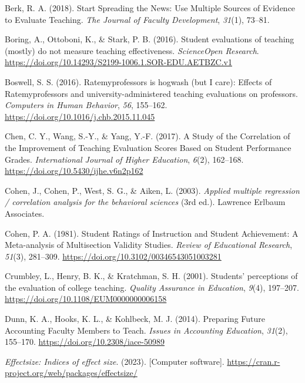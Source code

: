 \documentclass[
  man]{apa7}
\newlength{\cslhangindent}
\newlength{\cslentryspacingunit} %
\newenvironment{CSLReferences}[2] %
 {%
  \setlength{\parindent}{0pt}
  \ifodd #1
  \let\oldpar\par
  \def\par{\hangindent=\cslhangindent\oldpar}
  \fi
  \setlength{\parskip}{#2\cslentryspacingunit}
 }%
 {}
\begin{document}
\begin{CSLReferences}{1}{0}
\leavevmode{}%
Berk, R. A. (2018). Start Spreading the News: Use Multiple Sources of Evidence to Evaluate Teaching. \emph{The Journal of Faculty Development}, \emph{31}(1), 73--81.

\leavevmode{}%
Boring, A., Ottoboni, K., \& Stark, P. B. (2016). Student evaluations of teaching (mostly) do not measure teaching effectiveness. \emph{ScienceOpen Research}. \url{https://doi.org/10.14293/S2199-1006.1.SOR-EDU.AETBZC.v1}

\leavevmode{}%
Boswell, S. S. (2016). Ratemyprofessors is hogwash (but I care): Effects of Ratemyprofessors and university-administered teaching evaluations on professors. \emph{Computers in Human Behavior}, \emph{56}, 155--162. \url{https://doi.org/10.1016/j.chb.2015.11.045}

\leavevmode{}%
Chen, C. Y., Wang, S.-Y., \& Yang, Y.-F. (2017). A Study of the Correlation of the Improvement of Teaching Evaluation Scores Based on Student Performance Grades. \emph{International Journal of Higher Education}, \emph{6}(2), 162--168. \url{https://doi.org/10.5430/ijhe.v6n2p162}

\leavevmode{}%
Cohen, J., Cohen, P., West, S. G., \& Aiken, L. (2003). \emph{Applied multiple regression / correlation analysis for the behavioral sciences} (3rd ed.). Lawrence Erlbaum Associates.

\leavevmode{}%
Cohen, P. A. (1981). Student Ratings of Instruction and Student Achievement: A Meta-analysis of Multisection Validity Studies. \emph{Review of Educational Research}, \emph{51}(3), 281--309. \url{https://doi.org/10.3102/00346543051003281}

\leavevmode{}%
Crumbley, L., Henry, B. K., \& Kratchman, S. H. (2001). Students{'} perceptions of the evaluation of college teaching. \emph{Quality Assurance in Education}, \emph{9}(4), 197--207. \url{https://doi.org/10.1108/EUM0000000006158}

\leavevmode{}%
Dunn, K. A., Hooks, K. L., \& Kohlbeck, M. J. (2014). Preparing Future Accounting Faculty Members to Teach. \emph{Issues in Accounting Education}, \emph{31}(2), 155--170. \url{https://doi.org/10.2308/iace-50989}

\leavevmode{}%
\emph{Effectsize: Indices of effect size}. (2023). {[}Computer software{]}. \url{https://cran.r-project.org/web/packages/effectsize/}


\end{CSLReferences}
\end{document}
